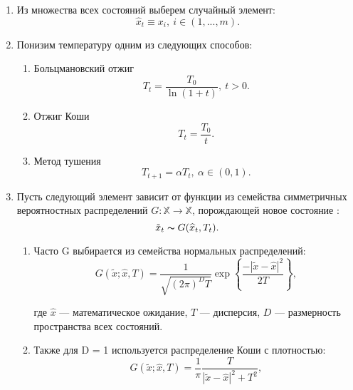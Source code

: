 \begin{enumerate}
	\item  Из множества всех состояний выберем случайный элемент:
	\[
		\widehat{x}_t \equiv x_i,\ i \in (1, ..., m).
	\]

	\item Понизим температуру одним из следующих способов:

		\begin{enumerate}
			\item Больцмановский отжиг
			\begin{equation}
			T_t = \dfrac{T_0}{\ln (1 + t)}, \ t > 0.
			\label{eq:boltzman}
			\end{equation}

			\item Отжиг Коши
			\begin{equation}
			T_t  =  \dfrac{T_0}{t}.
			\end{equation}

			\item Метод тушения
			\begin{equation}
			T_{t + 1} = \alpha T_t,\ \alpha \in (0, 1).
			\label{eq:tushenie}
			\end{equation}

		\end{enumerate}


	\item Пусть следующий элемент зависит от функции из семейства симметричных вероятностных распределений $G \colon \mathbb{X} \to \mathbb{X}$, порождающей новое состояние \cite{Lopatin}:
	\[
	\tilde{x}_t \thicksim G(\widehat{x}_t, T_t).
	\]

	\begin{enumerate}

		\item Часто G выбирается из семейства нормальных распределений:
		\begin{equation}
		\label{eq:normal_G}
		G(\tilde{x}; \widehat{x}, T)
		=
		\dfrac{1}
		{\sqrt{(2\pi)^{D} T}}
		\exp
		\left\lbrace
		\dfrac{- |\tilde{x} - \widehat{x}|^2}{2T}
		\right\rbrace,
		\end{equation}

		где $\widehat{x}$ — математическое ожидание, $T$  — дисперсия, $D$ — размерность пространства всех состояний.

		\item Также для D = 1 используется распределение Коши с плотностью:
		\begin{equation}
		G(\tilde{x}; \widehat{x}, T)
		=
		\dfrac{1}{\pi}
		\dfrac{T}{|\tilde{x}- \widehat{x}|^2 + T^2},
		\end{equation}


\end{enumerate}
\end{enumerate}
